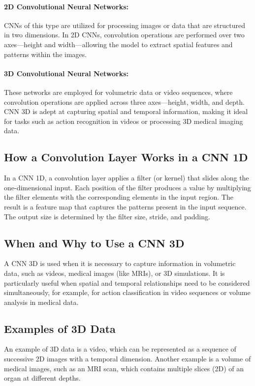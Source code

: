 \documentclass{article}
\begin{document}
\paragraph{2D Convolutional Neural Networks:} 
CNNs of this type are utilized for processing images or data that are structured in two dimensions. In 2D CNNs, convolution operations are performed over two axes—height and width—allowing the model to extract spatial features and patterns within the images.

\paragraph{3D Convolutional Neural Networks:} 
These networks are employed for volumetric data or video sequences, where convolution operations are applied across three axes—height, width, and depth. CNN 3D is adept at capturing spatial and temporal information, making it ideal for tasks such as action recognition in videos or processing 3D medical imaging data.

\subsection{How a Convolution Layer Works in a CNN 1D}
In a CNN 1D, a convolution layer applies a filter (or kernel) that slides along the one-dimensional input. Each position of the filter produces a value by multiplying the filter elements with the corresponding elements in the input region. The result is a feature map that captures the patterns present in the input sequence. The output size is determined by the filter size, stride, and padding.

\subsection{When and Why to Use a CNN 3D}
A CNN 3D is used when it is necessary to capture information in volumetric data, such as videos, medical images (like MRIs), or 3D simulations. It is particularly useful when spatial and temporal relationships need to be considered simultaneously, for example, for action classification in video sequences or volume analysis in medical data.

\subsection{Examples of 3D Data}
An example of 3D data is a video, which can be represented as a sequence of successive 2D images with a temporal dimension. Another example is a volume of medical images, such as an MRI scan, which contains multiple slices (2D) of an organ at different depths.
\end{document}

